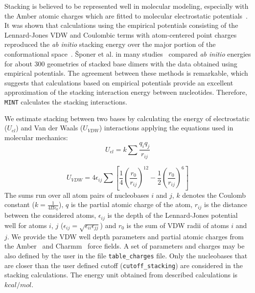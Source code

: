 \documentclass[12pt]{article}
\begin{document}

Stacking is believed to be represented well in molecular modeling, especially with the Amber atomic charges which are fitted to molecular electrostatic potentials~\cite{Hobza2008}. It was shown that calculations using the empirical potentials consisting of the Lennard-Jones VDW and Coulombic terms with atom-centered point charges reproduced the {\it ab initio} stacking energy over the major portion of the conformational space~\cite{Leszczynski2002}.
\v{S}poner et al. in many studies~\cite{Carter2000,Sponer1997, Base1996, Hobza1995} compared {\it ab initio} energies for about 300 geometries of stacked base dimers with the data obtained using empirical potentials. The agreement between these methods is remarkable, which suggests that calculations based on empirical potentials provide an excellent approximation of the stacking interaction energy between nucleotides. Therefore, {\tt MINT} calculates the stacking interactions.

We estimate stacking between two bases by calculating the energy of electrostatic ($U_{el}$) and Van der Waals ($U_{VDW}$) interactions applying the equations used in molecular mechanics:
\begin{equation}
U_{el} = k \sum{\frac{q_i q_j}{r_{ij}}}
\end{equation}

\begin{equation}
U_{VDW} = 4 \epsilon_{ij} \sum{ \left[ \frac{1}{4} {\left( \frac{r_0}{r_{ij}} \right) }^{12} - \frac{1}{2} {\left( \frac{r_0}{r_{ij}} \right) }^{6} \right]}
\end{equation}
The sums run over all atom pairs of nucleobases $i$ and $j$, $k$ denotes the Coulomb constant ($k = \frac{1}{4 \Pi \epsilon_0}$), $q$ is the partial atomic charge of the atom, $r_{ij}$ is the distance between the considered atoms, $\epsilon_{ij}$ is the depth of the Lennard-Jones potential well for atoms $i$, $j$ ($\epsilon_{ij} = \sqrt{\epsilon_{ii}\epsilon_{jj}} $) and $r_0$ is the sum of VDW radii of atoms $i$ and $j$. We provide the VDW well depth parameters and partial atomic charges from the Amber~\cite{Wang2000} and Charmm~\cite{Mackerell2000,Foloppe2000} force fields. A set of parameters and charges may be also defined by the user in the file {\tt table\_charges} file. Only the nucleobases that are closer than the user defined cutoff ({\tt cutoff\_stacking}) are considered in the stacking calculations. The energy unit obtained from described calculations is $kcal/mol$. 
\end{document}
